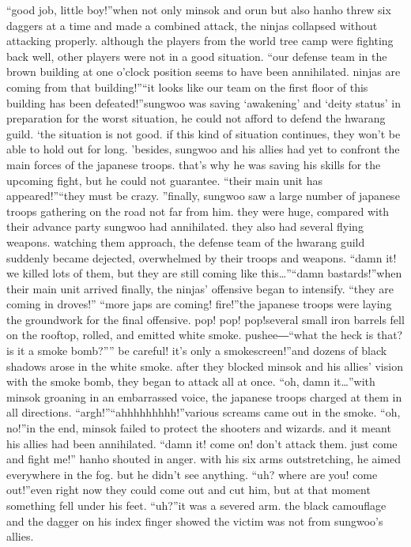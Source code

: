 “good job, little boy!”when not only minsok and orun but also hanho threw six daggers at a time and made a combined attack, the ninjas collapsed without attacking properly.
although the players from the world tree camp were fighting back well, other players were not in a good situation.
“our defense team in the brown building at one o’clock position seems to have been annihilated.
 ninjas are coming from that building!”“it looks like our team on the first floor of this building has been defeated!”sungwoo was saving ‘awakening’ and ‘deity status’ in preparation for the worst situation, he could not afford to defend the hwarang guild.
‘the situation is not good.
 if this kind of situation continues, they won’t be able to hold out for long.
’besides, sungwoo and his allies had yet to confront the main forces of the japanese troops.
 that’s why he was saving his skills for the upcoming fight, but he could not guarantee.
“their main unit has appeared!”“they must be crazy.
”finally, sungwoo saw a large number of japanese troops gathering on the road not far from him.
 they were huge, compared with their advance party sungwoo had annihilated.
 they also had several flying weapons.
watching them approach, the defense team of the hwarang guild suddenly became dejected, overwhelmed by their troops and weapons.
“damn it! we killed lots of them, but they are still coming like this…”“damn bastards!”when their main unit arrived finally, the ninjas’ offensive began to intensify.
“they are coming in droves!”
“more japs are coming! fire!”the japanese troops were laying the groundwork for the final offensive.
pop! pop! pop!several small iron barrels fell on the rooftop, rolled, and emitted white smoke.
pushee―“what the heck is that? is it a smoke bomb?”” be careful! it’s only a smokescreen!”and dozens of black shadows arose in the white smoke.
 after they blocked minsok and his allies’ vision with the smoke bomb, they began to attack all at once.
“oh, damn it…”with minsok groaning in an embarrassed voice, the japanese troops charged at them in all directions.
“argh!”“ahhhhhhhhh!”various screams came out in the smoke.
“oh, no!”in the end, minsok failed to protect the shooters and wizards.
 and it meant his allies had been annihilated.
“damn it! come on! don’t attack them.
 just come and fight me!” hanho shouted in anger.
with his six arms outstretching, he aimed everywhere in the fog.
 but he didn’t see anything.
“uh? where are you! come out!”even right now they could come out and cut him, but at that moment something fell under his feet.
“uh?”it was a severed arm.
 the black camouflage and the dagger on his index finger showed the victim was not from sungwoo’s allies.
